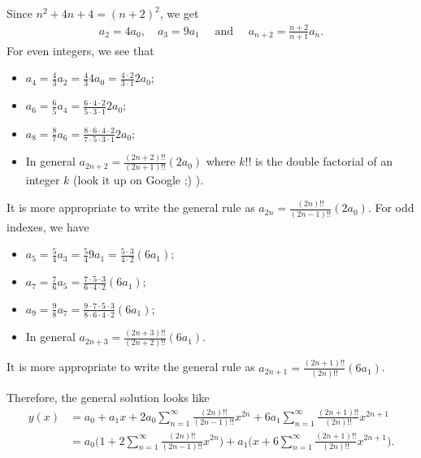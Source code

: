 \documentclass[12pt]{article}
\begin{document}
	Since $n^2 + 4n + 4 = (n + 2)^2$, we get
		\begin{align*}
		a_2 = 4 a_0 , \quad a_3 = 9 a_1 \quad \text{ and } \quad a_{n + 2} = \frac{n + 2}{n + 1} a_{n} .
		\end{align*}
	For even integers, we see that
		\begin{itemize}
		\item $a_4 = \frac{4}{3} a_2 = \frac{4}{3} 4 a_0 = \frac{4 \cdot 2}{3 \cdot 1} 2 a_0$;
		\item $a_6 = \frac{6}{5} a_4 = \frac{6 \cdot 4 \cdot 2}{5 \cdot 3 \cdot 1} 2 a_0$;
		\item $a_8 = \frac{8}{7} a_6 = \frac{8 \cdot 6 \cdot 4 \cdot 2}{7 \cdot 5 \cdot 3 \cdot 1} 2 a_0$;
		\item In general $a_{2n + 2} = \frac{(2n + 2)!!}{(2n + 1)!!} (2a_0)$ where $k!!$ is the double factorial of an integer $k$ (look it up on Google ;) ).
		\end{itemize}
	It is more appropriate to write the general rule as $a_{2n} = \frac{(2n)!!}{(2n - 1)!!} (2a_0)$. For odd indexes, we have
		\begin{itemize}
		\item $a_5 = \frac{5}{4} a_3 = \frac{5}{4} 9a_1 = \frac{5 \cdot 3}{4 \cdot 2} (6 a_1)$;
		\item $a_7 = \frac{7}{6} a_5 = \frac{7 \cdot 5 \cdot 3}{6 \cdot 4 \cdot 2} (6 a_1)$;
		\item $a_9 = \frac{9}{8} a_7 = \frac{9 \cdot 7 \cdot 5 \cdot 3}{8 \cdot 6 \cdot 4 \cdot 2} (6a_1)$;
		\item In general $a_{2n + 3} = \frac{(2n + 3)!!}{(2n + 2)!!} (6a_1)$.
		\end{itemize}
	It is more appropriate to write the general rule as $a_{2n + 1} = \frac{(2n + 1)!!}{(2n)!!} (6a_1)$.
	
	Therefore, the general solution looks like
		\begin{align*}
		y(x) &= a_0 + a_1 x + 2 a_0 \sum_{n = 1}^\infty \frac{(2n)!!}{(2n - 1)!!} x^{2n} + 6a_1 \sum_{n = 1}^\infty \frac{(2n + 1)!!}{(2n)!!} x^{2n + 1} \\
		&= a_0 \Big( 1 + 2 \sum_{n = 1}^\infty \frac{(2n)!!}{(2n-1)!!} x^{2n} \Big) + a_1 \Big( x + 6 \sum_{n = 1}^{\infty} \frac{(2n + 1)!!}{(2n)!!} x^{2n + 1} \Big) .
		\end{align*}
	
\end{document}
